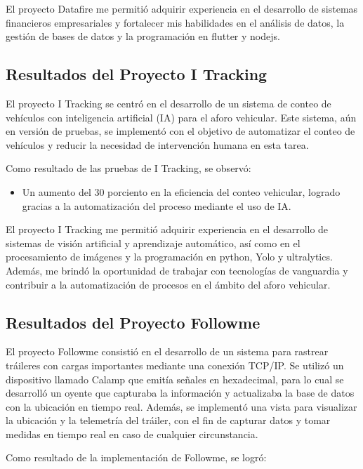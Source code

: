 \documentclass[protocolo.tex]{subfiles}
\begin{document}
El proyecto Datafire me permitió adquirir experiencia en el desarrollo de sistemas financieros empresariales y fortalecer mis habilidades en el análisis de datos, la gestión de bases de datos y la programación en flutter y nodejs.


\subsection{Resultados del Proyecto I Tracking}

El proyecto I Tracking se centró en el desarrollo de un sistema de conteo de vehículos con inteligencia artificial (IA) para el aforo vehicular.  Este sistema, aún en versión de pruebas, se implementó con el objetivo de automatizar el conteo de vehículos y reducir la necesidad de intervención humana en esta tarea.

Como resultado de las pruebas de I Tracking, se observó:

\begin{itemize}
\item Un aumento del 30 porciento en la eficiencia del conteo vehicular,  logrado gracias a la automatización del proceso mediante el uso de IA.
\end{itemize}

El proyecto I Tracking me permitió adquirir experiencia en el desarrollo de sistemas de visión artificial y aprendizaje automático, así como en el procesamiento de imágenes y la programación en python, Yolo y ultralytics.  Además, me brindó la oportunidad de trabajar con tecnologías de vanguardia y contribuir a la automatización de procesos en el ámbito del aforo vehicular.

\subsection{Resultados del Proyecto Followme}

El proyecto Followme consistió en el desarrollo de un sistema para rastrear tráileres con cargas importantes mediante una conexión TCP/IP.  Se utilizó un dispositivo llamado Calamp que emitía señales en hexadecimal, para lo cual se desarrolló un oyente que capturaba la información y  actualizaba la base de datos con la ubicación en tiempo real.  Además, se implementó una vista para visualizar la ubicación y la telemetría del tráiler, con el fin de capturar datos y tomar medidas en tiempo real en caso de cualquier circunstancia.

Como resultado de la implementación de Followme, se logró:
\end{document}
